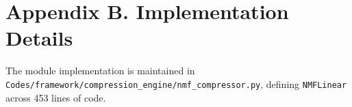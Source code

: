 \section*{Appendix B. Implementation Details}
The module implementation is maintained in \texttt{Codes/framework/compression\_engine/nmf\_compressor.py}, defining \texttt{NMFLinear} across 453 lines of code.
